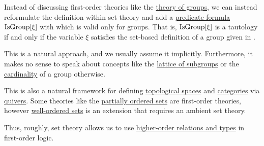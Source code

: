\begin{remark}\label{rem:first_order_theories_in_zfc}
  Instead of discussing first-order theories like the \hyperref[def:group/theory]{theory of groups}, we can instead reformulate the definition within set theory and add a \hyperref[rem:predicate_formula]{predicate formula} \( \operatorname{IsGroup}[\xi] \) with which is valid only for groups. That is, \( \operatorname{IsGroup}[\xi] \) is a tautology if and only if the variable \( \xi \) satisfies the set-based definition of a group given in .

  This is a natural approach, and we usually assume it implicitly. Furthermore, it makes no sense to speak about concepts like the \hyperref[thm:substructures_form_complete_lattice]{lattice of subgroups} or the \hyperref[def:cardinal]{cardinality} of a group otherwise.

  This is also a natural framework for defining \hyperref[def:topological_space]{topological spaces} and \hyperref[def:category]{categories} via \hyperref[def:quiver]{quivers}. Some theories like the \hyperref[def:partially_ordered_set]{partially ordered sets} are first-order theories, however \hyperref[def:well_ordered_set]{well-ordered sets} is an extension that requires an ambient set theory.

  Thus, roughly, set theory allows us to use \hyperref[rem:higher_order_logic]{higher-order relations and types} in first-order logic.
\end{remark}
